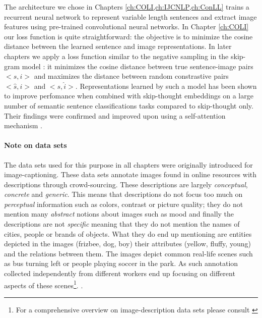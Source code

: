 The architecture we chose in
Chapters \ref{ch:COLI,ch:IJCNLP,ch:ConLL} trains a recurrent neural network to
represent variable length sentences and extract image features using pre-trained
convolutional neural networks. In Chapter \ref{ch:COLI} our loss function
is quite straightforward: the objective is to minimize the cosine distance
between the learned sentence and image representations. In later chapters we
apply a loss function similar to the negative sampling
in the skip-gram model \cite{mikolov2013distributed}: it minimizes the cosine
distance between true sentence-image pairs $<s, i>$ and maximizes the distance
between random constrastive pairs $<\hat{s}, i>$ and $<s, \hat{i}>$.
Representations learned by such a model has been shown \cite{kiela2017learning}
to improve perfomance when combined with skip-thought embeddings
on a large number of semantic sentence classifications tasks compared to
skip-thought only. Their findings were confirmed and improved upon using a
self-attention mechanism \cite{yoo2017improving}.

\paragraph{Note on data sets}


The data sets used for this purpose in all chapters were originally
introduced for image-captioning.
These data sets annotate images found in online resources with descriptions
through crowd-sourcing.
These descriptions are largely \emph{conceptual}, \emph{concrete}
and \emph{generic}.
This means that descriptions do not focus too much on \emph{perceptual}
information such as colors, contrast or picture quality; they do not mention
many \emph{abstract} notions about images such as mood and finally the descriptions
are not \emph{specific} meaning that they do not mention the names of cities,
people or brands of objects.
What they do end up mentioning are entities depicted in the images
(frizbee, dog, boy) their attributes (yellow, fluffy, young) and the
relations between them.
The images depict common real-life scenes such as bus turning left or people
playing soccer in the park. As such annotation collected independently from
different workers end up focusing on different aspects of these scenes\footnote{For a comprehensive overview on image-description data sets
please consult \cite{bernardi2016automatic}}.
.

